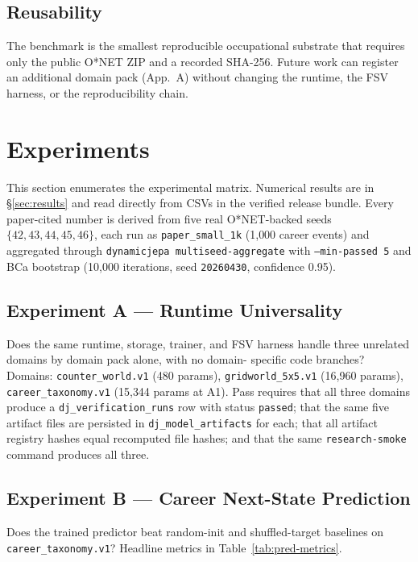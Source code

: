 \documentclass[10pt,twocolumn,letterpaper]{article}
\newcommand{\code}[1]{\texttt{\small #1}}
\begin{document}
\subsection{Reusability}

The benchmark is the smallest reproducible occupational substrate
that requires only the public O*NET ZIP and a recorded SHA-256.
Future work can register an additional domain pack (App.~A) without
changing the runtime, the FSV harness, or the reproducibility
chain.

\section{Experiments}
\label{sec:exp}

This section enumerates the experimental matrix. Numerical results
are in \S\ref{sec:results} and read directly from CSVs in the
verified release bundle. Every paper-cited number is derived from
five real O*NET-backed seeds $\{42, 43, 44, 45, 46\}$, each run as
\code{paper\_small\_1k} (1{,}000 career events) and aggregated
through \code{dynamicjepa multiseed-aggregate} with
\code{--min-passed 5} and BCa bootstrap (10{,}000 iterations,
seed \code{20260430}, confidence 0.95).

\subsection{Experiment A --- Runtime Universality}

Does the same runtime, storage, trainer, and FSV harness handle
three unrelated domains by domain pack alone, with no domain-
specific code branches? Domains:
\code{counter\_world.v1} (480 params),
\code{gridworld\_5x5.v1} (16{,}960 params),
\code{career\_taxonomy.v1} (15{,}344 params at A1). Pass requires
that all three domains produce a \code{dj\_verification\_runs} row
with status \code{passed}; that the same five artifact files are
persisted in \code{dj\_model\_artifacts} for each; that all
artifact registry hashes equal recomputed file hashes; and that
the same \code{research-smoke} command produces all three.

\subsection{Experiment B --- Career Next-State Prediction}

Does the trained predictor beat random-init and shuffled-target
baselines on \code{career\_taxonomy.v1}? Headline metrics in
Table~\ref{tab:pred-metrics}.
\end{document}
